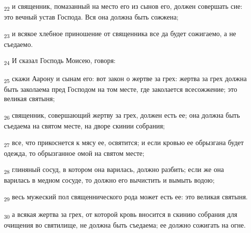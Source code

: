 \begin{tcolorbox}
\textsubscript{22} и священник, помазанный на место его из сынов его, должен совершать сие: это вечный устав Господа. Вся она должна быть сожжена;
\end{tcolorbox}
\begin{tcolorbox}
\textsubscript{23} и всякое хлебное приношение от священника все да будет сожигаемо, а не съедаемо.
\end{tcolorbox}
\begin{tcolorbox}
\textsubscript{24} И сказал Господь Моисею, говоря:
\end{tcolorbox}
\begin{tcolorbox}
\textsubscript{25} скажи Аарону и сынам его: вот закон о жертве за грех: жертва за грех должна быть заколаема пред Господом на том месте, где заколается всесожжение; это великая святыня;
\end{tcolorbox}
\begin{tcolorbox}
\textsubscript{26} священник, совершающий жертву за грех, должен есть ее; она должна быть съедаема на святом месте, на дворе скинии собрания;
\end{tcolorbox}
\begin{tcolorbox}
\textsubscript{27} все, что прикоснется к мясу ее, освятится; и если кровью ее обрызгана будет одежда, то обрызганное омой на святом месте;
\end{tcolorbox}
\begin{tcolorbox}
\textsubscript{28} глиняный сосуд, в котором она варилась, должно разбить; если же она варилась в медном сосуде, то должно его вычистить и вымыть водою;
\end{tcolorbox}
\begin{tcolorbox}
\textsubscript{29} весь мужеский пол священнического рода может есть ее: это великая святыня.
\end{tcolorbox}
\begin{tcolorbox}
\textsubscript{30} а всякая жертва за грех, от которой кровь вносится в скинию собрания для очищения во святилище, не должна быть съедаема; ее должно сожигать на огне.
\end{tcolorbox}
